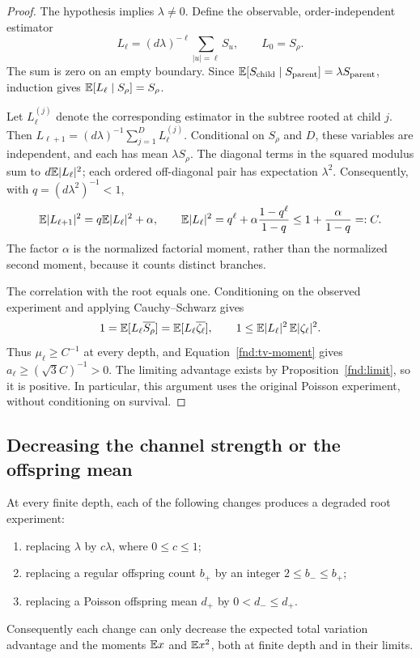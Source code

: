 \begin{proof}
The hypothesis implies \(\lambda\neq0\).  Define the observable,
order-independent estimator
\begin{equation}\label{fnd:linear-estimator}
 L_\ell=(d\lambda)^{-\ell}\sum_{|u|=\ell}S_u,
 \qquad L_0=S_\rho.
\end{equation}
The sum is zero on an empty boundary.  Since
\(\mathbb E[S_{\mathrm{child}}\mid S_{\mathrm{parent}}]
=\lambda S_{\mathrm{parent}}\), induction gives
\(\mathbb E[L_\ell\mid S_\rho]=S_\rho\).

Let \(L_\ell^{(j)}\) denote the corresponding estimator in the
subtree rooted at child \(j\).  Then
\(L_{\ell+1}=(d\lambda)^{-1}\sum_{j=1}^D L_\ell^{(j)}\).
Conditional on \(S_\rho\) and \(D\), these variables are independent,
and each has mean \(\lambda S_\rho\).  The diagonal terms in the
squared modulus sum to \(d\mathbb E|L_\ell|^2\); each ordered off-diagonal
pair has expectation \(\lambda^2\).  Consequently, with
\(q=(d\lambda^2)^{-1}<1\),
\begin{equation}\label{fnd:estimator-recurrence}
 \mathbb E|L_{\ell+1}|^2
 =q\mathbb E|L_\ell|^2+\alpha,\qquad
 \mathbb E|L_\ell|^2=q^\ell+\alpha\frac{1-q^\ell}{1-q}
 \leq1+\frac{\alpha}{1-q}=:C.
\end{equation}
The factor \(\alpha\) is the normalized factorial moment, rather
than the normalized second moment, because it counts distinct branches.

The correlation with the root equals one.  Conditioning on the observed
experiment and applying Cauchy--Schwarz gives
\[
 1=\mathbb E[L_\ell\overline{S_\rho}]
   =\mathbb E[L_\ell\overline{\zeta_\ell}],\qquad
 1\leq\mathbb E|L_\ell|^2\,\mathbb E|\zeta_\ell|^2.
\]
Thus \(\mu_\ell\geq C^{-1}\) at every depth, and
Equation~\eqref{fnd:tv-moment} gives
\(a_\ell\geq(\sqrt3 C)^{-1}>0\).  The limiting advantage exists by
Proposition~\ref{fnd:limit}, so it is positive.  In particular, this
argument uses the original Poisson experiment, without conditioning
on survival.
\end{proof}

\subsection{Decreasing the channel strength or the offspring mean}

\begin{proposition}
\label{fnd:degradation}
At every finite depth, each of the following changes produces a
degraded root experiment:
\begin{enumerate}
 \item replacing \(\lambda\) by \(c\lambda\), where \(0\leq c\leq1\);
 \item replacing a regular offspring count \(b_+\) by an integer
       \(2\leq b_-\leq b_+\);
 \item replacing a Poisson offspring mean \(d_+\) by
       \(0<d_-\leq d_+\).
\end{enumerate}
Consequently each change can only decrease the expected total variation
advantage and the moments \(\mathbb E x\) and \(\mathbb E x^2\), both at finite
depth and in their limits.
\end{proposition}

